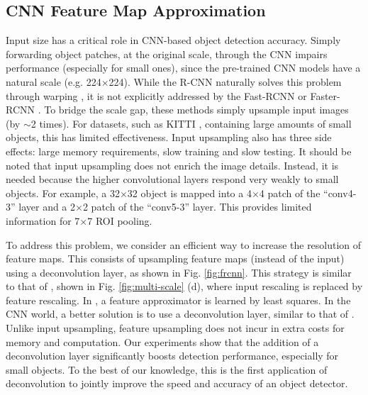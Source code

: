 \documentclass[runningheads]{llncs}
\begin{document}
\subsection{CNN Feature Map Approximation}
\label{subsec:size}

Input size has a critical role in CNN-based object detection accuracy.
Simply forwarding object patches, at the original scale, through the CNN
impairs performance (especially for small ones), since the
pre-trained CNN models have a natural scale (e.g. 224$\times$224).
While the R-CNN naturally solves this problem through
warping \cite{DBLP:conf/cvpr/GirshickDDM14}, it is not explicitly
addressed by the Fast-RCNN \cite{DBLP:conf/iccv/Girshick15} or
Faster-RCNN \cite{DBLP:conf/nips/shaoqing15fasterRcnn}. To bridge
the scale gap, these methods simply upsample input images (by $\sim$2 times).
For datasets, such as KITTI \cite{DBLP:conf/cvpr/GeigerLU12}, containing
large amounts of small objects, this has limited effectiveness.
Input upsampling also has three side effects: large memory requirements, slow
training and slow testing. It should be noted that input upsampling does not
enrich the image details. Instead, it is needed because
the higher convolutional layers respond very weakly to small objects.
For example, a 32$\times$32 object is mapped into a 4$\times$4
patch of the ``conv4-3'' layer and a 2$\times$2 patch of the ``conv5-3''
layer. This provides limited information for 7$\times$7
ROI pooling.

To address this problem, we consider an efficient
way to increase the resolution of feature maps. This consists of upsampling
feature maps (instead of the input) using a deconvolution layer,
as shown in Fig. \ref{fig:frcnn}. This strategy is similar to
that of \cite{DBLP:journals/pami/DollarABP14}, shown in Fig.
\ref{fig:multi-scale} (d), where input rescaling is replaced by feature
rescaling. In \cite{DBLP:journals/pami/DollarABP14}, a feature approximator
is learned by least squares. In the CNN world, a better solution is
to use a deconvolution layer, similar to that of
\cite{DBLP:conf/cvpr/LongSD15}. Unlike input upsampling, feature upsampling
does not incur in extra costs for memory and computation. Our
experiments show that the addition of a deconvolution layer significantly
boosts detection performance, especially for small objects.
To the best of our knowledge, this is the first application of deconvolution to jointly improve the speed and accuracy of an object detector.
\end{document}
